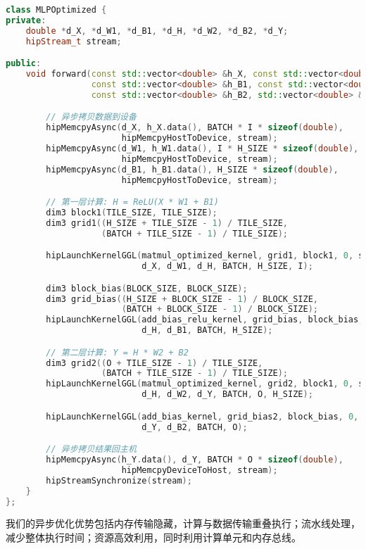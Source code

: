 \documentclass[12pt,a4paper]{article}
\begin{document}
\begin{lstlisting}[language=c++,caption=异步内存传输优化]
class MLPOptimized {
private:
    double *d_X, *d_W1, *d_B1, *d_H, *d_W2, *d_B2, *d_Y;
    hipStream_t stream;

public:
    void forward(const std::vector<double> &h_X, const std::vector<double> &h_W1,
                 const std::vector<double> &h_B1, const std::vector<double> &h_W2,
                 const std::vector<double> &h_B2, std::vector<double> &h_Y) {

        // 异步拷贝数据到设备
        hipMemcpyAsync(d_X, h_X.data(), BATCH * I * sizeof(double),
                       hipMemcpyHostToDevice, stream);
        hipMemcpyAsync(d_W1, h_W1.data(), I * H_SIZE * sizeof(double),
                       hipMemcpyHostToDevice, stream);
        hipMemcpyAsync(d_B1, h_B1.data(), H_SIZE * sizeof(double),
                       hipMemcpyHostToDevice, stream);

        // 第一层计算: H = ReLU(X * W1 + B1)
        dim3 block1(TILE_SIZE, TILE_SIZE);
        dim3 grid1((H_SIZE + TILE_SIZE - 1) / TILE_SIZE,
                   (BATCH + TILE_SIZE - 1) / TILE_SIZE);

        hipLaunchKernelGGL(matmul_optimized_kernel, grid1, block1, 0, stream,
                           d_X, d_W1, d_H, BATCH, H_SIZE, I);

        dim3 block_bias(BLOCK_SIZE, BLOCK_SIZE);
        dim3 grid_bias((H_SIZE + BLOCK_SIZE - 1) / BLOCK_SIZE,
                       (BATCH + BLOCK_SIZE - 1) / BLOCK_SIZE);
        hipLaunchKernelGGL(add_bias_relu_kernel, grid_bias, block_bias, 0, stream,
                           d_H, d_B1, BATCH, H_SIZE);

        // 第二层计算: Y = H * W2 + B2
        dim3 grid2((O + TILE_SIZE - 1) / TILE_SIZE,
                   (BATCH + TILE_SIZE - 1) / TILE_SIZE);
        hipLaunchKernelGGL(matmul_optimized_kernel, grid2, block1, 0, stream,
                           d_H, d_W2, d_Y, BATCH, O, H_SIZE);

        hipLaunchKernelGGL(add_bias_kernel, grid_bias2, block_bias, 0, stream,
                           d_Y, d_B2, BATCH, O);

        // 异步拷贝结果回主机
        hipMemcpyAsync(h_Y.data(), d_Y, BATCH * O * sizeof(double),
                       hipMemcpyDeviceToHost, stream);
        hipStreamSynchronize(stream);
    }
};
\end{lstlisting}

我们的异步优化优势包括内存传输隐藏，计算与数据传输重叠执行；流水线处理，减少整体执行时间；资源高效利用，同时利用计算单元和内存总线。
\end{document}
